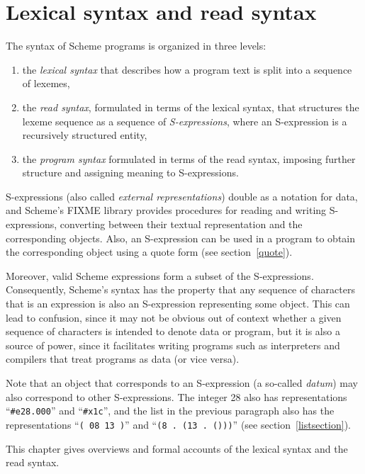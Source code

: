 
\chapter{Lexical syntax and read syntax}

The syntax of Scheme programs is organized in three levels:
%
\begin{enumerate}
\item the \textit{lexical syntax} that describes how a program text is split
  into a sequence of lexemes,
\item the \textit{read syntax}, formulated in terms of the lexical
  syntax, that structures the lexeme sequence as a sequence of
  \textit{S-expressions}, where an S-expression is
    a recursively structured entity,
\item the \textit{program syntax} formulated in terms of the read
  syntax, imposing further structure and assigning meaning to
  S-expressions.
\end{enumerate}
%
S-expressions (also called \textit{external
  representations}) double
as a notation for data, and Scheme's FIXME library provides procedures
for reading and writing S-expressions, converting between their
textual representation and the corresponding objects.  Also, an
S-expression can be used in a program to obtain the corresponding
object using a {\cf quote} form (see section~\ref{quote}).

Moreover, valid Scheme expressions form a subset of the S-expressions.
Consequently, Scheme's syntax has the property that any sequence of
characters that is an expression is also an S-expression representing
some object.  This can lead to confusion, since it may not be obvious
out of context whether a given sequence of characters is intended to
denote data or program, but it is also a source of power, since it
facilitates writing programs such as interpreters and compilers that
treat programs as data (or vice versa).

Note that an object that corresponds to an S-expression (a so-called
\textit{datum}) may also correspond to other S-expressions.  The
integer 28 also has representations ``{\tt \#e28.000}'' and
``{\tt\#x1c}'', and the list in the previous paragraph also has the
representations ``{\tt( 08 13 )}'' and ``{\tt(8 .\ (13 .\ ()))}'' (see
section~\ref{listsection}).

This chapter gives overviews and formal accounts of the lexical
syntax and the read syntax.

